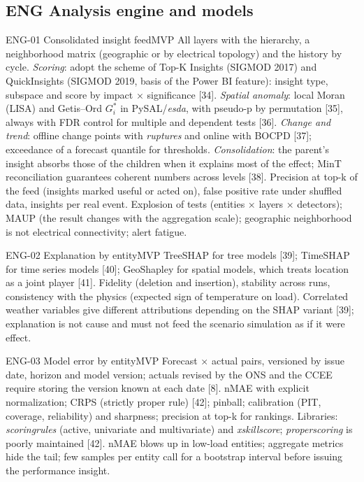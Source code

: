 \subsection{ENG \textperiodcentered{} Analysis engine and models}

\begin{ficha}{ENG-01 \textperiodcentered{} Consolidated insight feed}{MVP}
 All layers with the hierarchy, a neighborhood matrix
(geographic or by electrical topology) and the history by cycle.
 \emph{Scoring}: adopt the scheme of Top-K Insights
(SIGMOD 2017) and QuickInsights (SIGMOD 2019, basis of the Power BI feature):
insight type, subspace and score by impact × significance [34].
\emph{Spatial anomaly}: local Moran (LISA) and Getis--Ord $G_i^*$ in
PySAL/\emph{esda}, with pseudo-p by permutation [35], always with FDR
control for multiple and dependent tests [36]. \emph{Change and trend}:
offline change points with \emph{ruptures} and online with BOCPD [37];
exceedance of a forecast quantile for thresholds. \emph{Consolidation}: the
parent's insight absorbs those of the children when it explains most of the effect;
MinT reconciliation guarantees coherent numbers across levels [38].
 Precision at top-k of the feed (insights marked useful or
acted on), false positive rate under shuffled data, insights per
real event.
 Explosion of tests (entities × layers × detectors);
MAUP (the result changes with the aggregation scale); geographic neighborhood is
not electrical connectivity; alert fatigue.
\end{ficha}

\begin{ficha}{ENG-02 \textperiodcentered{} Explanation by entity}{MVP}
 TreeSHAP for tree models [39]; TimeSHAP for
time series models [40]; GeoShapley for spatial models, which treats
location as a joint player [41].
 Fidelity (deletion and insertion), stability across
runs, consistency with the physics (expected sign of temperature on
load).
 Correlated weather variables give different
attributions depending on the SHAP variant [39]; explanation is not cause and
must not feed the scenario simulation as if it were effect.
\end{ficha}

\begin{ficha}{ENG-03 \textperiodcentered{} Model error by entity}{MVP}
 Forecast × actual pairs, versioned by issue date,
horizon and model version; actuals revised by the ONS and the CCEE
require storing the version known at each date [8].
 nMAE with explicit normalization; CRPS (strictly
proper rule) [42]; pinball; calibration (PIT, coverage, reliability) and
sharpness; precision at top-k for rankings. Libraries: \emph{scoringrules}
(active, univariate and multivariate) and \emph{xskillscore};
\emph{properscoring} is poorly maintained [42].
 nMAE blows up in low-load entities; aggregate
metrics hide the tail; few samples per entity call for a bootstrap
interval before issuing the performance insight.
\end{ficha}


